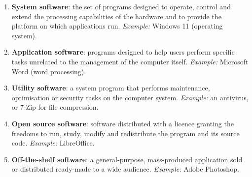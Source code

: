 \documentclass[11pt]{article}
\begin{document}
\begin{corrige}
\begin{enumerate}
\item \textbf{System software}: the set of programs designed to operate, control and extend the processing capabilities of the hardware and to provide the platform on which applications run. \emph{Example:} Windows 11 (operating system).
\item \textbf{Application software}: programs designed to help users perform specific tasks unrelated to the management of the computer itself. \emph{Example:} Microsoft Word (word processing).
\item \textbf{Utility software}: a system program that performs maintenance, optimisation or security tasks on the computer system. \emph{Example:} an antivirus, or 7-Zip for file compression.
\item \textbf{Open source software}: software distributed with a licence granting the freedoms to run, study, modify and redistribute the program and its source code. \emph{Example:} LibreOffice.
\item \textbf{Off-the-shelf software}: a general-purpose, mass-produced application sold or distributed ready-made to a wide audience. \emph{Example:} Adobe Photoshop.
\end{enumerate}
\end{corrige}
\end{document}

